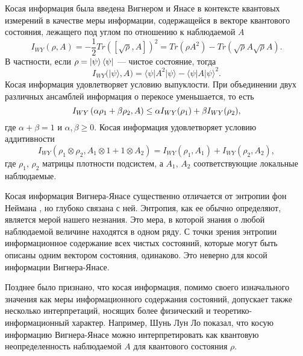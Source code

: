 Косая информация\cite{Wigner1963} была введена Вигнером и Янасе
в контексте квантовых измерений в качестве меры информации,
содержащейся в векторе квантового состояния, лежащего под углом по отношению к наблюдаемой $A$
%
\begin{equation}\label{eq:wyi}
  I_{WY}(\rho, A)
  = -\frac{1}{2} Tr([\sqrt{\rho}, A])^2
  = Tr(\rho A^2) - Tr(\sqrt \rho A \sqrt \rho  A ).
\end{equation}
%
В частности, если $\rho = \left| \psi \right\rangle\left\langle \psi \right|$ --- чистое состояние, тогда
%
\begin{equation}\label{eq:wyi-pure}
  I_{WY}(| \psi \rangle, A)
  = \langle \psi | A^2 | \psi \rangle - \langle \psi | A| \psi \rangle ^2.
\end{equation}
Косая информация удовлетворяет условию выпуклости.
При объединении двух различных ансамблей информация о перекосе уменьшается, то есть
%
\begin{equation}\label{eq:wyi-convex}
  I_{WY}\left( \alpha \rho_1 + \beta \rho_2, A \right)
  \leq \alpha I_{WY}(\rho_1) + \beta I_{WY}(\rho_2),
\end{equation}
где $\alpha + \beta = 1$ и $\alpha, \beta \geq 0$.
%
Косая информация удовлетворяет условию аддитивности
%
\begin{equation}\label{eq:wyi-additivity}
 I_{WY}(\rho_1 \otimes \rho_2, A_1 \otimes 1 + 1 \otimes A_2)
 = I_{WY}(\rho_1, A_1) + I_{WY}(\rho_2, A_2),
\end{equation}
%
где $\rho_1$, $\rho_2$ матрицы плотности подсистем,
а $A_1$, $A_2$ соответствующие локальные наблюдаемые.
%

Косая информация Вигнера-Янасе существенно отличается от энтропии фон Неймана \cite{Wigner1960, Lieb1973prl, Lieb1973, Wehrl1978},
но глубоко связана с ней.
Энтропия, как ее обычно определяют, является мерой нашего незнания\cite{Weaver1949}.
Это мера, в которой знания о любой наблюдаемой величине находятся в одном ряду.
С точки зрения энтропии информационное содержание всех чистых состояний,
которые могут быть описаны одним вектором состояния, одинаково.
Это неверно для косой информации Вигнера-Янасе.

Позднее было признано, что косая информация,
помимо своего изначального значения как меры информационного содержания состояний,
допускает также несколько интерпретаций,
носящих более физический и теоретико-информационный характер.
Например, Шунь Лун Ло показал\cite{Luo2003prl, Luo2005, Luo2005pra, Luo2006, Luo2017},
что косую информацию Вигнера-Янасе можно интерпретировать
как квантовую неопределенность наблюдаемой $A$ для квантового состояния $\rho$.

